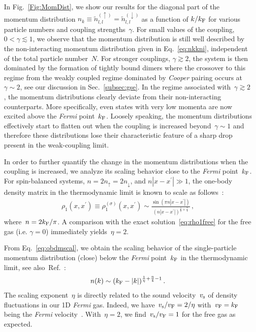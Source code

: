 \documentclass[pra,aps,groupedaddress,floatfix,twocolumn,superscriptaddress,showpacs,nofootinbib]{revtex4-1}
\newcommand{\be}{\begin{eqnarray}}
\newcommand{\ee}{\end{eqnarray}}
\newcommand{\kf}{k_\textnormal{F}}
\begin{document}
{In Fig.~\ref{Fig:MomDist}, we show our results for the diagonal part of the momentum
distribution $n_{k}\equiv \tilde{n}^{(\uparrow)}_{l,l}= \tilde{n}^{(\downarrow)}_{l,l}$
as a function of $k/\kf$ for various particle numbers and coupling strengths~$\gamma$.
For small values of the coupling, $0<\gamma \lesssim 1$, we observe that the momentum distribution
is still well described by the non-interacting momentum distribution given in Eq.~\eqref{eq:nkkni},
independent of the total particle number~$N$. For stronger couplings, $\gamma \gtrsim 2$, the system is then dominated
by the formation of tightly bound dimers where the crossover to this regime from the
weakly coupled regime dominated by {\it Cooper} pairing occurs at~$\gamma\sim 2$,
see our discussion in Sec.~\ref{subsec:gse}. In the regime associated with~$\gamma\gtrsim 2$,
the momentum distributions clearly deviate from their non-interacting counterparts.
More specifically,
even states with very low momenta are now excited above the
{\it Fermi} point~$\kf$. Loosely speaking, the momentum distributions
{effectively start to flatten out} when the coupling is increased beyond~$\gamma \sim 1$
and therefore
these distributions lose their characteristic feature of a sharp drop present in the weak-coupling limit.

In order to further quantify the change in the momentum distributions when the coupling is increased,
we analyze its scaling behavior close to the {\it Fermi} {point~$\kf$.}
For spin-balanced systems, $n=2n_{\uparrow}=2n_{\downarrow}$, and $n|x-x^{\prime}| \gg 1$,
the one-body density matrix  in the thermodynamic limit is known to scale
as follows~\cite{PhysRevB.9.2911,PhysRevLett.47.1840,2004JPhB...37S...1C}:
%
\be
\rho_1 (x,x^{\prime}) \equiv \rho_1^{(\sigma)}(x,x^{\prime})
 \sim \frac{\sin\left(\pi n|x-x^{\prime}|\right)}{(n|x-x^{\prime}|)^{\frac{1}{\eta}+\frac{\eta}{4}}}\,,
\label{eq:obdmscal}
\ee
%
where~$n=2\kf/\pi$.
A comparison with the exact solution~\eqref{eq:rho1free} for the free gas (i.e. $\gamma=0$)
immediately yields~$\eta=2$.

From Eq.~\eqref{eq:obdmscal}, we obtain
the scaling behavior of the single-particle {momentum distribution
(close) below the {\it Fermi} point~$\kf$ in}
the thermodynamic limit, see also~Ref.~\cite{RevModPhys.80.1215}:
%
\be
n(k) \sim (\kf -|k|)^{\frac{1}{\eta}+\frac{\eta}{4}-1}\,.\label{eq:nlowk}
\ee
%
The scaling exponent~$\eta$ is directly related to the sound velocity~$v_{\rm s}$ of density fluctuations
in our 1D {\it Fermi} gas. Indeed, we have~$v_{\rm s}/v_{\rm F} = 2/\eta$
with~$v_{\rm F}=\kf$ being the {\it Fermi} velocity~\cite{PhysRevB.9.2911,PhysRevLett.47.1840}.
With~$\eta=2$, we find~$v_{\rm s}/v_{\rm F}=1$
for the free gas as expected.

}
\end{document}
